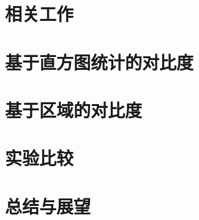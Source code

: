 \documentclass[final]{cvpr}
\begin{document}
\section{相关工作}
\label{sec:RelatedWorks}



\section{基于直方图统计的对比度}\label{sec:HC}

\section{基于区域的对比度}

\section{实验比较}\label{sec:Experiment}




\section{总结与展望}\label{sec:Conclusion}




% 
% 

\end{document}
